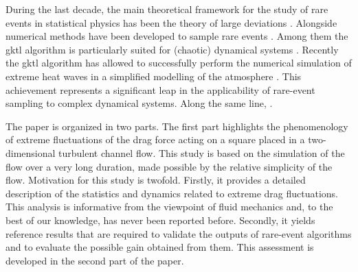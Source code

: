 \documentclass{jfm}
\newcommand{\EL}[1]{{\color{myred}{#1}}}
\begin{document}
During the last decade, the main theoretical framework for the study of rare events in statistical physics has been the theory of large deviations \citep{touchette_large_2009}.
Alongside numerical methods have been developed to sample rare events \citep{DelMoralBook}.
Among them the \ac{gktl} algorithm \citep{giardina_direct_2006} is particularly suited for (chaotic) dynamical systems \citep{giardina_simulating_2011,Laffargue_2013}.
% 
{Recently the \ac{gktl} algorithm has allowed to successfully perform the numerical simulation of extreme heat waves in a simplified modelling of the atmosphere \citep{ragone_computation_2018}.
  This achievement represents a significant leap in the applicability of rare-event sampling to complex dynamical systems. Along the same line, \EL{rare-event sampling algorithms are here applied outside of traditional applications by considering fluid-structure interaction in a turbulent flow}.}
% 

{The paper is organized in two parts. The first part highlights the phenomenology of extreme fluctuations of the drag force acting on a square placed in a two-dimensional turbulent channel flow. This study is based on the simulation of the flow over a very long duration, made possible by the relative simplicity of the flow.}
% 
Motivation for this study is twofold.
Firstly, it provides a detailed description of the statistics and dynamics related to extreme drag fluctuations. This analysis is informative from the  viewpoint of fluid mechanics and, to the best of our knowledge, has never been reported before.
Secondly, it yields reference results that are required to validate the outputs of rare-event algorithms and to evaluate the possible gain obtained from them. This assessment is developed in the second part of the paper.
\end{document}
